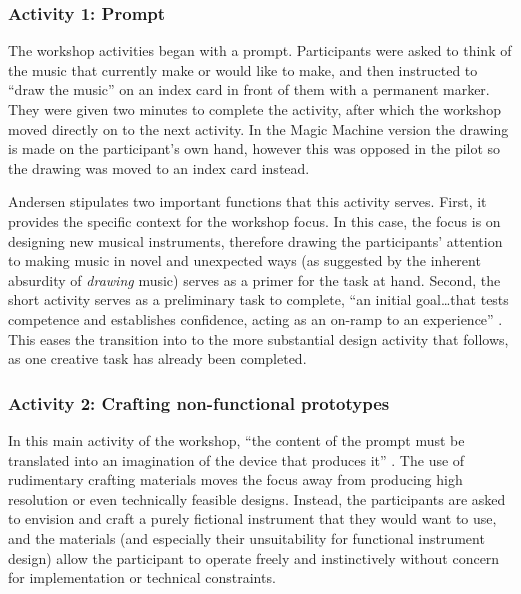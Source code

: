\documentclass[letterpaper, 12pt]{article}
\begin{document}
\subsubsection{Activity 1: Prompt}
\label{ch3-sec:activity-1-prompt}

The workshop activities began with a prompt. Participants were asked to think of the music that currently make or would like to make, and then instructed to ``draw the music'' on an index card in front of them with a permanent marker. They were given two minutes to complete the activity, after which the workshop moved directly on to the next activity. In the Magic Machine version the drawing is made on the participant's own hand, however this was opposed in the pilot so the drawing was moved to an index card instead.

Andersen stipulates two important functions that this activity serves. First, it provides the specific context for the workshop focus. In this case, the focus is on designing new musical instruments, therefore drawing the participants' attention to making music in novel and unexpected ways (as suggested by the inherent absurdity of \emph{drawing} music) serves as a primer for the task at hand. Second, the short activity serves as a preliminary task to complete, ``an initial goal\ldots that tests competence and establishes confidence, acting as an on-ramp to an experience'' \citep[p. 5]{Andersen2019}. This eases the transition into to the more substantial design activity that follows, as one creative task has already been completed. 

\subsubsection{Activity 2: Crafting non-functional prototypes}
\label{ch3-sec:activity-2-crafting-non-functional-prototypes}

In this main activity of the workshop, ``the content of the prompt must be translated into an imagination of the device that produces it'' \citep[p. 5]{Andersen2019}. The use of rudimentary crafting materials moves the focus away from producing high resolution or even technically feasible designs. Instead, the participants are asked to envision and craft a purely fictional instrument that they would want to use, and the materials (and especially their unsuitability for functional instrument design) allow the participant to operate freely and instinctively without concern for implementation or technical constraints.
\end{document}
